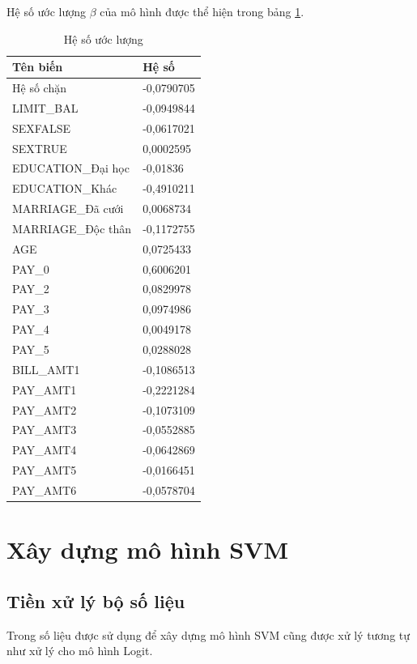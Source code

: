 \documentclass[a4paper]{report}\usepackage[]{graphicx}\usepackage[]{color}
\begin{document}
Hệ số ước lượng $\beta$ của mô hình được thể hiện trong bảng \ref{tab:lasso_final}. 

\begin{table}[htb!]
\centering
\begin{tabular}{ll}
  \hline
Tên biến & Hệ số \\ 
  \hline
Hệ số chặn & -0,0790705 \\ 
  LIMIT\_BAL & -0,0949844 \\ 
  SEXFALSE & -0,0617021 \\ 
  SEXTRUE & 0,0002595 \\ 
  EDUCATION\_Đại học & -0,01836 \\ 
  EDUCATION\_Khác & -0,4910211 \\ 
  MARRIAGE\_Đã cưới & 0,0068734 \\ 
  MARRIAGE\_Độc thân & -0,1172755 \\ 
  AGE & 0,0725433 \\ 
  PAY\_0 & 0,6006201 \\ 
  PAY\_2 & 0,0829978 \\ 
  PAY\_3 & 0,0974986 \\ 
  PAY\_4 & 0,0049178 \\ 
  PAY\_5 & 0,0288028 \\ 
  BILL\_AMT1 & -0,1086513 \\ 
  PAY\_AMT1 & -0,2221284 \\ 
  PAY\_AMT2 & -0,1073109 \\ 
  PAY\_AMT3 & -0,0552885 \\ 
  PAY\_AMT4 & -0,0642869 \\ 
  PAY\_AMT5 & -0,0166451 \\ 
  PAY\_AMT6 & -0,0578704 \\ 
   \hline
\end{tabular}
\caption{Hệ số ước lượng} 
\label{tab:lasso_final}
\end{table}




\section{Xây dựng mô hình SVM}

\subsection{Tiền xử lý bộ số liệu}
Trong số liệu được sử dụng để xây dựng mô hình SVM cũng được xử lý tương tự như xử lý cho mô hình Logit.
\end{document}
